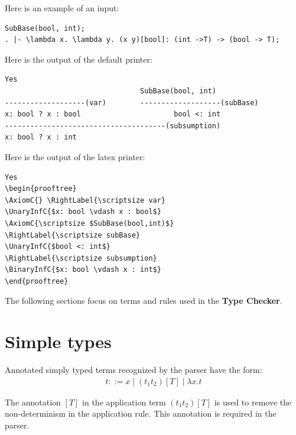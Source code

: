 \documentclass[12pt,a4paper]{article}
\begin{document}
Here is an example of an input:



\begin{lstlisting}  
SubBase(bool, int);
. |- \lambda x. \lambda y. (x y)[bool]: (int ->T) -> (bool -> T);
\end{lstlisting}

Here is the output of the default printer:


\begin{lstlisting}  
Yes
                                SubBase(bool, int)
-------------------(var)        -------------------(subBase)
x: bool ? x : bool                      bool <: int
--------------------------------------(subsumption)
x: bool ? x : int

\end{lstlisting}

Here is the output of the latex printer:


\begin{lstlisting} 
Yes
\begin{prooftree}
\AxiomC{} \RightLabel{\scriptsize var}
\UnaryInfC{$x: bool \vdash x : bool$}
\AxiomC{\scriptsize $SubBase(bool,int)$}
\RightLabel{\scriptsize subBase}
\UnaryInfC{$bool <: int$}
\RightLabel{\scriptsize subsumption}
\BinaryInfC{$x: bool \vdash x : int$}
\end{prooftree}

\end{lstlisting} 

The following sections focus on terms and rules used in the \textbf{Type Checker}. 

\section{Simple types} \label{sec:simple}

Annotated simply typed terms recognized by the parser have the form:
\begin{align*}
t::= x \;|\; (t_1 t_2)[T]\;|\; \lambda x.t
\end{align*}

The annotation $[T]$ in the application term $(t_1 t_2)[T]$ is used to remove the non-determinism in the application rule. This annotation is required in the parser. 
\end{document}
